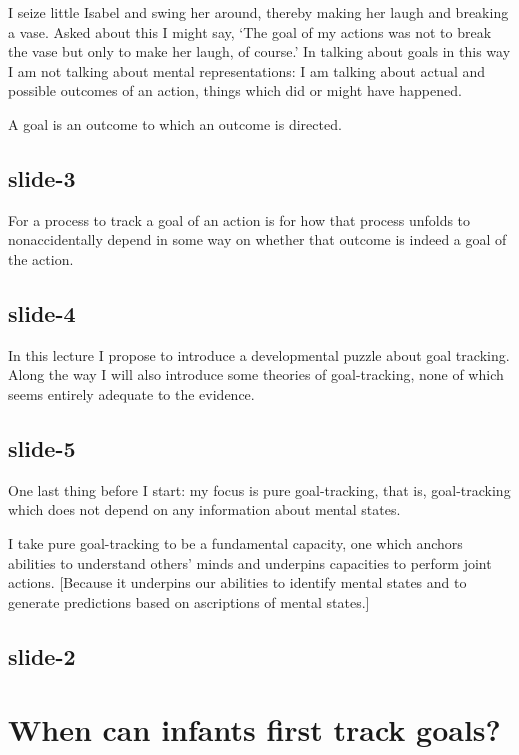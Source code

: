 \documentclass[12pt,\papersize]{extarticle}
\begin{document}
\setlength\footnotesep{1em}








      
I seize little Isabel and swing her around, thereby making her laugh and 
breaking a vase.
Asked about this I might say, ‘The goal of my actions was not to break the vase
but only to make her laugh, of course.’
In talking about goals in this way I am not talking about mental representations:
I am talking about actual and possible outcomes of an action, things which did or might 
have happened.
 
A goal is an outcome to which an outcome is directed.
 
\subsection{slide-3}
For a process to track a goal of an action is for how that process unfolds to nonaccidentally
depend in some way on whether that outcome is indeed a goal of the action.
 
\subsection{slide-4}
In this lecture I propose to introduce a developmental puzzle about goal tracking.
Along the way I will also introduce some theories of goal-tracking, none of which 
seems entirely adequate to the evidence.
 
\subsection{slide-5}
One last thing before I start: my focus is pure goal-tracking, that is, goal-tracking which
does not depend on any information about mental states.
 
I take pure goal-tracking to be a fundamental capacity, one which anchors abilities to 
understand others’ minds and underpins capacities to perform joint actions.
[Because it underpins our abilities to identify mental states and to generate predictions based on
ascriptions of mental states.]
 
\subsection{slide-2}
 
 
\section{When can infants first track goals?}
 
\end{document}
